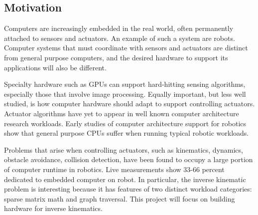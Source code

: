 \subsection*{Motivation}

Computers are increasingly embedded in the real world, often permanently attached to sensors and actuators. An example of such a system are robots. Computer systems that must coordinate with sensors and actuators are distinct from general purpose computers, and the desired hardware to support its applications will also be different.

Specialty hardware such as GPUs can support hard-hitting sensing algorithms, especially those that involve image processing. Equally important, but less well studied, is how computer hardware should adapt to support controlling actuators. Actuator algorithms have yet to appear in well known computer architecture research workloads. Early studies of computer architecture support for robotics show that general purpose CPUs suffer when running typical robotic workloads\cite{Caselli}.

Problems that arise when controlling actuators, such as kinematics, dynamics, obstacle avoidance, collision detection, have been found to occupy a large portion of computer runtime in robotics. Live measurements show 33-66 percent dedicated to embedded computer on robot. In particular, the inverse kinematic problem is interesting because it has features of two distinct workload categories: sparse matrix math and graph traversal\cite{dwarfs}. This project will focus on building hardware for inverse kinematics.


